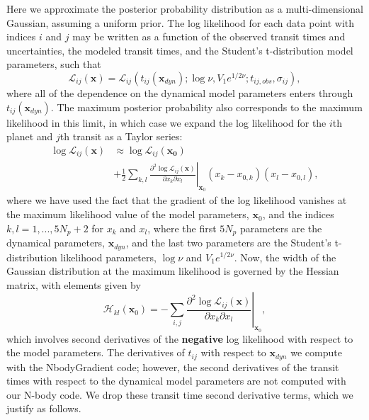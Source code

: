 \documentclass[twocolumn]{aastex63}
\begin{document}
Here we approximate the posterior probability distribution as a multi-dimensional Gaussian, assuming a uniform prior.  
The log likelihood for each data point with indices $i$ and $j$ may be written as a function of the observed transit times and uncertainties, the modeled transit times, and the Student's t-distribution model parameters, such that
\begin{equation}
    \mathcal{L}_{ij}(\mathbf{x}) = \mathcal{L}_{ij}(t_{ij}(\mathbf{x}_{dyn});\log{\nu},V_1e^{1/2\nu};t_{ij,obs},\sigma_{ij}),
\end{equation}
where all of the dependence on the dynamical model parameters enters through $t_{ij}(\mathbf{x}_{dyn})$.  
The maximum posterior probability also corresponds to the maximum likelihood in this limit, in which case we expand the log likelihood for the $i$th planet and $j$th transit as a Taylor series:
\begin{equation}
    \begin{split}
        \log{\mathcal{L}_{ij}(\mathbf{x})} &\approx  \log \mathcal{L}_{ij}(\mathbf{x_0})\\
        &+ \frac{1}{2} \sum_{k,l} \left.\frac{\partial^2 \log\mathcal{L}_{ij}(\mathbf{x})}{\partial x_k \partial x_l}\right\vert_{\mathbf{x}_0}(x_k - x_{0,k})(x_l - x_{0,l}),
    \end{split}
\end{equation}
where we have used the fact that the gradient of the log likelihood vanishes at the maximum likelihood value of the model parameters, $\mathbf{x}_0$, and the indices $k,l = 1,...,5N_p+2$ for $x_k$ and $x_l$, where the first $5N_p$ parameters are the dynamical parameters, $\mathbf{x}_{dyn}$, and the last two parameters are the Student's t-distribution likelihood parameters, $\log{\nu}$ and $V_1e^{1/2\nu}$.
Now, the width of the Gaussian distribution at the maximum likelihood is governed by the Hessian matrix, with elements given by
\begin{equation}
    \mathcal{H}_{kl}(\mathbf{x}_0) =  -\sum_{i,j} \left.\frac{\partial^2 \log\mathcal{L}_{ij}(\mathbf{x})}{\partial x_k \partial x_l}\right\vert_{\mathbf{x}_0},
\end{equation}
which involves second derivatives of the \textbf{negative} log likelihood with respect to the model parameters.  
The derivatives of $t_{ij}$ with respect to $\mathbf{x}_{dyn}$ we compute with the \textsf{NbodyGradient} code;  however, the second derivatives of the transit times with respect to the dynamical model parameters are not computed with our N-body code.  We drop these transit time second derivative terms, which we justify as follows.
\end{document}
